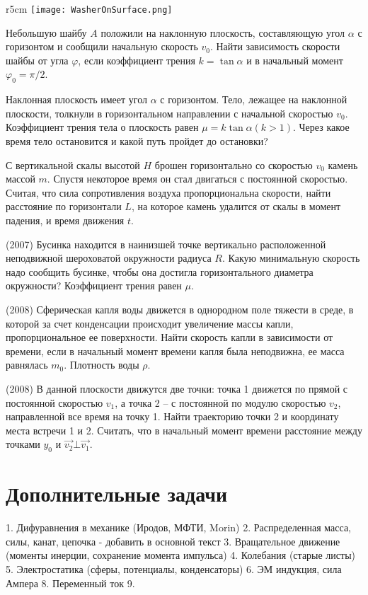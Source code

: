 \begin{wrapfigure}{r}{5cm}
\texttt{[image: WasherOnSurface.png]}
\end{wrapfigure}
\AddProb Небольшую шайбу $A$ положили на наклонную плоскость, составляющую угол $\alpha$ с горизонтом и сообщили начальную скорость $v_0$. Найти зависимость скорости шайбы от угла $\varphi$, если коэффициент трения $k = \tan \alpha$ и в начальный момент $\varphi_0 = \pi/2$.

\AddProb Наклонная плоскость имеет угол $\alpha$ с горизонтом. Тело, лежащее на наклонной плоскости, толкнули в горизонтальном направлении с начальной скоростью $v_0$. Коэффициент трения тела о плоскость равен $\mu = k \tan \alpha (k > 1)$. Через какое время тело остановится и какой путь пройдет до остановки?

\AddProb С вертикальной скалы высотой $H$ брошен горизонтально со скоростью $v_0$ камень массой $m$. Спустя некоторое время он стал двигаться с постоянной скоростью. Считая, что сила сопротивления воздуха пропорциональна скорости, найти расстояние по горизонтали $L$, на которое камень удалится от скалы в момент падения, и время движения $t$.

\AddProb (2007) Бусинка находится в наинизшей точке вертикально расположенной неподвижной шероховатой окружности радиуса $R$. Какую минимальную скорость надо сообщить бусинке, чтобы она достигла горизонтального диаметра окружности? Коэффициент трения равен $\mu$.

\AddProb (2008) Сферическая капля воды движется в однородном поле тяжести в среде, в которой за счет конденсации происходит увеличение массы капли, пропорциональное ее поверхности. Найти скорость капли в зависимости от времени, если в начальный момент времени капля была неподвижна, ее масса равнялась $m_0$. Плотность воды $\rho$.

\AddProb (2008) В данной плоскости движутся две точки: точка 1 движется по прямой с постоянной скоростью $v_1$, а точка 2 – с постоянной по модулю скоростью $v_2$, направленной все время на точку 1. Найти траекторию точки 2 и координату места встречи 1 и 2. Считать, что в начальный момент времени расстояние между точками $y_0$ и $\vec{v_2} \bot \vec{v_1}$.




\section{Дополнительные задачи}
1. Дифуравнения в механике (Иродов, МФТИ, Morin)
2. Распределенная масса, силы, канат, цепочка - добавить в основной текст 
3. Вращательное движение (моменты инерции, сохранение момента импульса)
4. Колебания (старые листы)
5. Электростатика (сферы, потенциалы, конденсаторы)
6. ЭМ индукция, сила Ампера
8. Переменный ток
9. %
